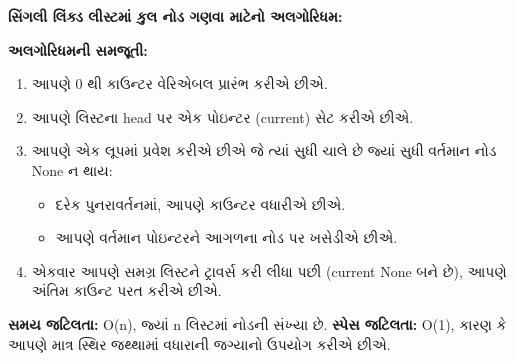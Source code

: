 \textbf{સિંગલી લિંક્ડ લીસ્ટમાં કુલ નોડ ગણવા માટેનો અલગોરિધમ:}

\begin{Shaded}
\begin{Highlighting}[]
\OperatorTok{=} 
    
\OperatorTok{=}
    
      \NormalTok{:}
\OperatorTok{+=} 
        
\OperatorTok{=}
    
\end{Highlighting}
\end{Shaded}

\textbf{અલગોરિધમની સમજૂતી:}

\begin{enumerate}
\def\labelenumi{\arabic{enumi}.}
\tightlist
\item
  આપણે 0 થી કાઉન્ટર વેરિએબલ પ્રારંભ કરીએ છીએ.
\item
  આપણે લિસ્ટના head પર એક પોઇન્ટર (current) સેટ કરીએ છીએ.
\item
  આપણે એક લૂપમાં પ્રવેશ કરીએ છીએ જે ત્યાં સુધી ચાલે છે જ્યાં સુધી વર્તમાન નોડ None ન
  થાય:

  \begin{itemize}
  \tightlist
  \item
    દરેક પુનરાવર્તનમાં, આપણે કાઉન્ટર વધારીએ છીએ.
  \item
    આપણે વર્તમાન પોઇન્ટરને આગળના નોડ પર ખસેડીએ છીએ.
  \end{itemize}
\item
  એકવાર આપણે સમગ્ર લિસ્ટને ટ્રાવર્સ કરી લીધા પછી (current None બને છે), આપણે અંતિમ
  કાઉન્ટ પરત કરીએ છીએ.
\end{enumerate}

\textbf{સમય જટિલતા:} O(n), જ્યાં n લિસ્ટમાં નોડની સંખ્યા છે. \textbf{સ્પેસ
જટિલતા:} O(1), કારણ કે આપણે માત્ર સ્થિર જથ્થામાં વધારાની જગ્યાનો ઉપયોગ કરીએ
છીએ.


